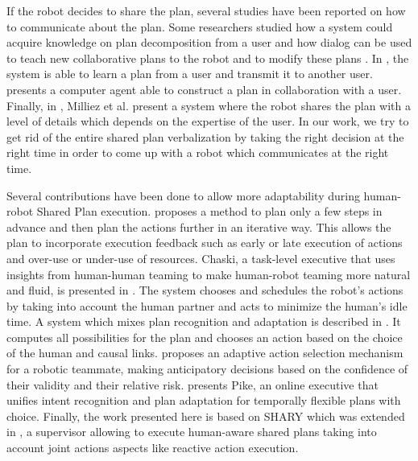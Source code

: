 \documentclass[english,a4paper,11pt,twoside]{StyleThese}
\begin{document}
If the robot decides to share the plan, several studies have been reported on how to communicate about the plan. Some researchers studied how a system could acquire knowledge on plan decomposition from a user \cite{Mohseni2015} and how dialog can be used to teach new collaborative plans to the robot and to modify these plans \cite{petit2013coordinating}. In \cite{sorce2015proof}, the system is able to learn a plan from a user and transmit it to another user. \cite{allen2002human} presents a computer agent able to construct a plan in collaboration with a user. Finally, in \cite{milliez2016using}, Milliez et al. present a system where the robot shares the plan with a level of details which depends on the expertise of the user. In our work, we try to get rid of the entire shared plan verbalization by taking the right decision at the right time in order to come up with a robot which communicates at the right time.

Several contributions have been done to allow more adaptability during human-robot Shared Plan execution. \cite{chien2000using} proposes a method to plan only a few steps in advance and then plan the actions further in an iterative way. This allows the plan to incorporate execution feedback such as early or late execution of actions and over-use or under-use of resources. Chaski, a task-level executive that uses insights from human-human teaming to make human-robot teaming more natural and fluid, is presented in \cite{shah2011improved}. The system chooses and schedules the robot’s actions by taking into account the human partner and acts to minimize the human’s idle time. A system which mixes plan recognition and adaptation is described in \cite{levine2014concurrent}. It computes all possibilities for the plan and chooses an action based on the choice of the human and causal links. \cite{hoffman2007effects} proposes an adaptive action selection mechanism for a robotic teammate, making anticipatory decisions based on the confidence of their validity and their relative risk. \cite{karpas2015robust} presents Pike, an online executive that unifies intent recognition and plan adaptation for temporally flexible plans with choice. Finally, the work presented here is based on SHARY \cite{clodic2009shary} which was extended in \cite{fiore2014planning}, a supervisor allowing to execute human-aware shared plans taking into account joint actions aspects like reactive action execution.
\end{document}
